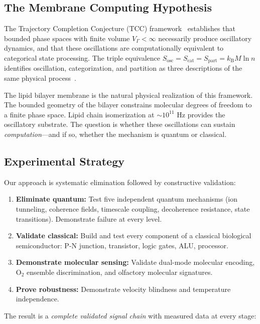 \documentclass[twocolumn,10pt,a4paper]{article}
\theoremstyle{definition}
\theoremstyle{remark}
\newcommand{\Sosc}{S_{\mathrm{osc}}}
\newcommand{\Scat}{S_{\mathrm{cat}}}
\newcommand{\Spart}{S_{\mathrm{part}}}
\newcommand{\kB}{k_{\mathrm{B}}}
\newcommand{\Vgamma}{V_\Gamma}
\begin{document}
\subsection{The Membrane Computing Hypothesis}

The Trajectory Completion Conjecture (TCC) framework~\citep{sachikonye2026trajectory, sachikonye2026backward} establishes that bounded phase spaces with finite volume $\Vgamma < \infty$ necessarily produce oscillatory dynamics, and that these oscillations are computationally equivalent to categorical state processing. The triple equivalence $\Sosc = \Scat = \Spart = \kB M \ln n$ identifies oscillation, categorization, and partition as three descriptions of the same physical process~\citep{sachikonye2026poincare}.

The lipid bilayer membrane is the natural physical realization of this framework. The bounded geometry of the bilayer constrains molecular degrees of freedom to a finite phase space. Lipid chain isomerization at $\sim 10^{11}$ Hz provides the oscillatory substrate. The question is whether these oscillations can sustain \emph{computation}---and if so, whether the mechanism is quantum or classical.

\subsection{Experimental Strategy}

Our approach is systematic elimination followed by constructive validation:

\begin{enumerate}[leftmargin=2em]
    \item \textbf{Eliminate quantum:} Test five independent quantum mechanisms (ion tunneling, coherence fields, timescale coupling, decoherence resistance, state transitions). Demonstrate failure at every level.
    \item \textbf{Validate classical:} Build and test every component of a classical biological semiconductor: P-N junction, transistor, logic gates, ALU, processor.
    \item \textbf{Demonstrate molecular sensing:} Validate dual-mode molecular encoding, O$_2$ ensemble discrimination, and olfactory molecular signatures.
    \item \textbf{Prove robustness:} Demonstrate velocity blindness and temperature independence.
\end{enumerate}

The result is a \emph{complete validated signal chain} with measured data at every stage:
\end{document}
